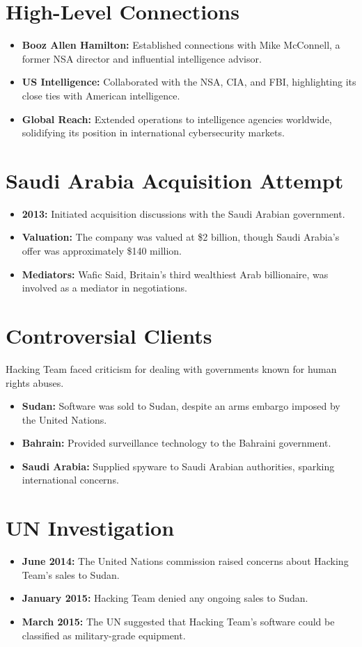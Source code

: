 \section{High-Level Connections}
\begin{itemize}
    \item \textbf{Booz Allen Hamilton:} Established connections with Mike McConnell, a former NSA director and influential intelligence advisor.
    \item \textbf{US Intelligence:} Collaborated with the NSA, CIA, and FBI, highlighting its close ties with American intelligence.
    \item \textbf{Global Reach:} Extended operations to intelligence agencies worldwide, solidifying its position in international cybersecurity markets.
\end{itemize}

\section{Saudi Arabia Acquisition Attempt}
\begin{itemize}
    \item \textbf{2013:} Initiated acquisition discussions with the Saudi Arabian government.
    \item \textbf{Valuation:} The company was valued at \$2 billion, though Saudi Arabia’s offer was approximately \$140 million.
    \item \textbf{Mediators:} Wafic Said, Britain’s third wealthiest Arab billionaire, was involved as a mediator in negotiations.
\end{itemize}

\section{Controversial Clients}
Hacking Team faced criticism for dealing with governments known for human rights abuses.
\begin{itemize}
    \item \textbf{Sudan:} Software was sold to Sudan, despite an arms embargo imposed by the United Nations.
    \item \textbf{Bahrain:} Provided surveillance technology to the Bahraini government.
    \item \textbf{Saudi Arabia:} Supplied spyware to Saudi Arabian authorities, sparking international concerns.
\end{itemize}

\section{UN Investigation}
\begin{itemize}
    \item \textbf{June 2014:} The United Nations commission raised concerns about Hacking Team’s sales to Sudan.
    \item \textbf{January 2015:} Hacking Team denied any ongoing sales to Sudan.
    \item \textbf{March 2015:} The UN suggested that Hacking Team’s software could be classified as military-grade equipment.
\end{itemize}

